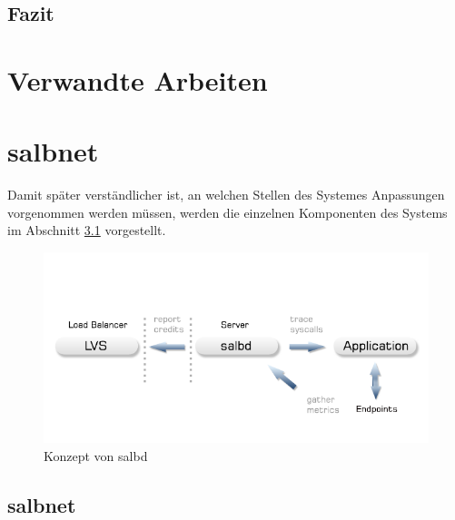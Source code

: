 \documentclass[a4paper, 12pt, BCOR10mm, DIV12, toc=bibliography, toc=listof, german]{scrbook}
\begin{document}


		\section{Fazit} %
		\label{sec:grundlagen-fazit}
		


	\chapter{Verwandte Arbeiten} %
	\label{cha:arbeiten}
	

	\chapter{salbnet} %
	\label{cha:salbnet}

		Damit später verständlicher ist, an welchen Stellen des Systemes Anpassungen vorgenommen werden
		müssen, werden die einzelnen Komponenten des Systems im Abschnitt \ref{sec:salbnet} vorgestellt.		

		\begin{figure}
			\centering
			\includegraphics[width=\textwidth]{images/salbd-concept}
			\caption{Konzept von salbd}
			\label{fig:}
		\end{figure}
		

		\section{salbnet} %
		\label{sec:salbnet}
\end{document}
